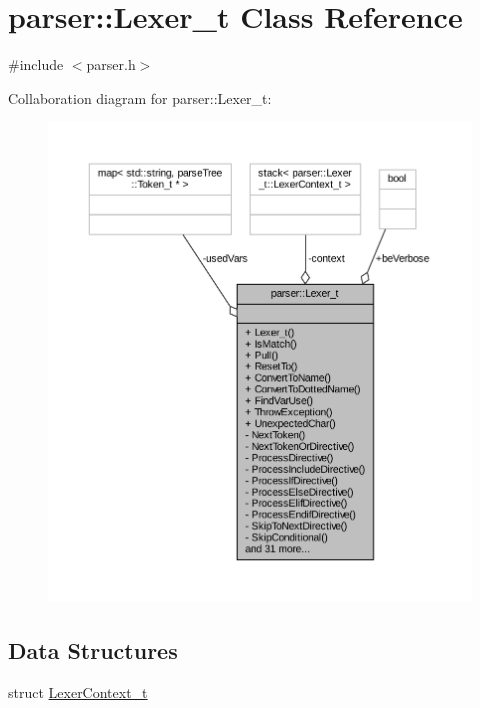 \hypertarget{classparser_1_1_lexer__t}{}\section{parser\+:\+:Lexer\+\_\+t Class Reference}
\label{classparser_1_1_lexer__t}


{\ttfamily \#include $<$parser.\+h$>$}



Collaboration diagram for parser\+:\+:Lexer\+\_\+t\+:
\nopagebreak
\begin{figure}[H]
\begin{center}
\leavevmode
\includegraphics[width=350pt]{classparser_1_1_lexer__t__coll__graph}
\end{center}
\end{figure}
\subsection*{Data Structures}
\begin{DoxyCompactItemize}
\item 
struct \hyperlink{structparser_1_1_lexer__t_1_1_lexer_context__t}{Lexer\+Context\+\_\+t}
\end{DoxyCompactItemize}
